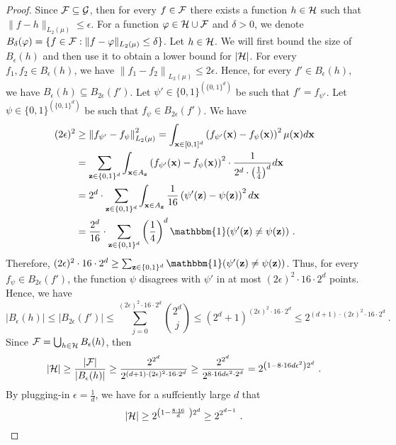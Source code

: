 \documentclass[11pt]{article}
\newcommand{\onefunc}{\mathbbm{1}}
\newcommand{\bx}{\mathbf{x}}
\newcommand{\bz}{\mathbf{z}}
\newcommand{\cg}{{\cal G}}
\newcommand{\ch}{{\cal H}}
\newcommand{\cf}{{\cal F}}
\newcommand{\norm}[1]{\left\|#1\right\|}
\newcommand{\snorm}[1]{\|#1\|} %
\begin{document}
\begin{proof}
	Since $\cf \subseteq \cg$, then for every $f \in \cf$ there exists a function $h \in \ch$ such that $\snorm{f-h}_{L_2(\mu)} \leq \epsilon$. 
	For a function $\varphi \in \ch \cup \cf$ and $\delta>0$, we denote $B_\delta(\varphi) = \{f \in \cf: \snorm{f-\varphi}_{L_2(\mu)} \leq \delta\}$.
	Let $h \in \ch$. We will first bound the size of $B_\epsilon(h)$ and then use it to obtain a lower bound for $|\ch|$.
	For every $f_1,f_2 \in B_\epsilon(h)$, we have $\norm{f_1-f_2}_{L_2(\mu)} \leq 2 \epsilon$. Hence, for every $f' \in B_\epsilon(h)$, we have $B_\epsilon(h) \subseteq B_{2\epsilon}(f')$.
	Let $\psi' \in \{0,1\}^{(\{0,1\}^d)}$ be such that $f'=f_{\psi'}$. Let $\psi \in  \{0,1\}^{(\{0,1\}^d)}$ be such that $f_\psi \in B_{2\epsilon}(f')$. We have
	\begin{align*}
		(2 \epsilon)^2 
		&\geq \norm{f_{\psi'}-f_\psi}^2_{L_2(\mu)}
		= \int_{\bx \in [0,1]^d} \left( f_{\psi'}(\bx) - f_\psi(\bx) \right)^2 \mu(\bx) d\bx
		\\
		&= \sum_{\bz \in \{0,1\}^d} \int_{\bx \in A_\bz} \left( f_{\psi'}(\bx) - f_\psi(\bx) \right)^2 \cdot \frac{1}{2^d \cdot \left(\frac{1}{4}\right)^d} d\bx
		\\
		&= 2^d \cdot \sum_{\bz \in \{0,1\}^d} \int_{\bx \in A_\bz} \frac{1}{16} \left( \psi'(\bz) - \psi(\bz) \right)^2 d\bx
		\\
		&= \frac{2^d}{16} \cdot \sum_{\bz \in \{0,1\}^d} \left(\frac{1}{4}\right)^d \onefunc(\psi'(\bz) \neq \psi(\bz))~.
	\end{align*}
	Therefore, $(2 \epsilon)^2 \cdot 16 \cdot 2^d \geq \sum_{\bz \in \{0,1\}^d} \onefunc(\psi'(\bz) \neq \psi(\bz))$.
	Thus, for every $f_\psi \in B_{2\epsilon}(f')$, the function $\psi$ disagrees with $\psi'$ in at most $(2 \epsilon)^2  \cdot 16 \cdot 2^d$ points. Hence, we have
	\[
		|B_\epsilon(h)|
		\leq |B_{2\epsilon}(f')| 
		\leq \sum_{j=0}^{(2 \epsilon)^2 \cdot 16 \cdot 2^d} \binom{2^d}{j}
		\leq (2^d+1) ^{(2 \epsilon)^2 \cdot 16 \cdot 2^d}
		\leq  2^{(d+1) \cdot (2 \epsilon)^2 \cdot 16 \cdot 2^d}~.
	\]
	Since $\cf = \bigcup_{h \in \ch} B_\epsilon(h)$, then 
	\[
		|\ch| 
		\geq \frac{|\cf|}{|B_\epsilon(h)|} 
		\geq \frac{2^{2^d}}{2^{(d+1) \cdot (2 \epsilon)^2  \cdot 16 \cdot 2^d}}
		\geq \frac{2^{2^d}}{2^{8  \cdot 16 d \epsilon^2 \cdot 2^d}}
		= 2^{  \left( 1 -  8  \cdot 16 d \epsilon^2 \right)2^d }~.
	\]
	By plugging-in $\epsilon=\frac{1}{d}$, we have for a suffciently large $d$ that 
	\begin{equation}
	\label{eq:bound ch}
		|\ch| 
		\geq 2^{  \left( 1 -  \frac{8  \cdot 16}{d} \ \right)2^d }
		\geq 2^{ 2^{d-1} }~.
	\end{equation}
	

\end{proof}
\end{document}
